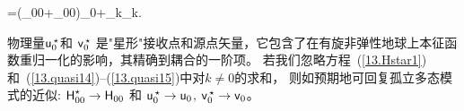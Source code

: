 {{{{=(\ssI_{00}+\ssC_{00})\sss_0+\sum_{k}\!\sss_k.
\en

物理量$\ssu_0^{\hspace{0.5 mm}
\raisebox{-0.45 ex}{$\scriptstyle\star$}}$和
$\ssv_0^{\hspace{0.5 mm}\raisebox{-0.45 ex}{$\scriptstyle\star$}}$
是"星形"接收点和源点矢量，它包含了在有旋非弹性地球上本征函数重归一化的影响，其精确到耦合的一阶项。
若我们忽略方程~(\ref{13.Hstar1})和~(\ref{13.quasi14})--(\ref{13.quasi15})中对$k\neq 0$的求和，
则如预期地可回复孤立多态模式的近似:
$\mbox{${\sf H}$}_{00}^{\star}\rightarrow\mbox{${\sf H}$}_{00}$
和 $\ssu_0^{\hspace{0.5 mm}\raisebox{-0.45 ex}
{$\scriptstyle\star$}}\rightarrow\ssu_0$,
$\ssv_0^{\hspace{0.5 mm}\raisebox{-0.45 ex}
{$\scriptstyle\star$}}\rightarrow\ssv_0$。

}}}}

